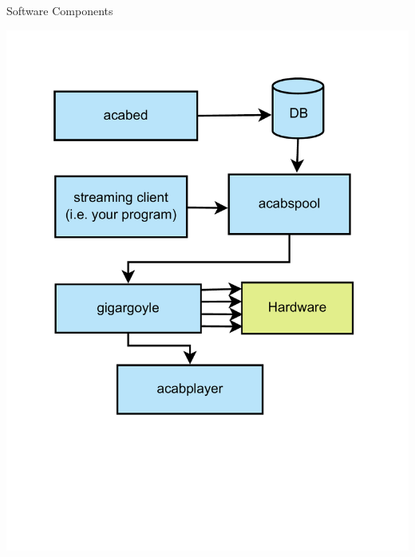 \documentclass{beamer}
\begin{document}
\begin{frame}{Software Components}

    \includegraphics[height=\paperheight/1.1]{bilder/software.pdf}

\end{frame}
\end{document}
